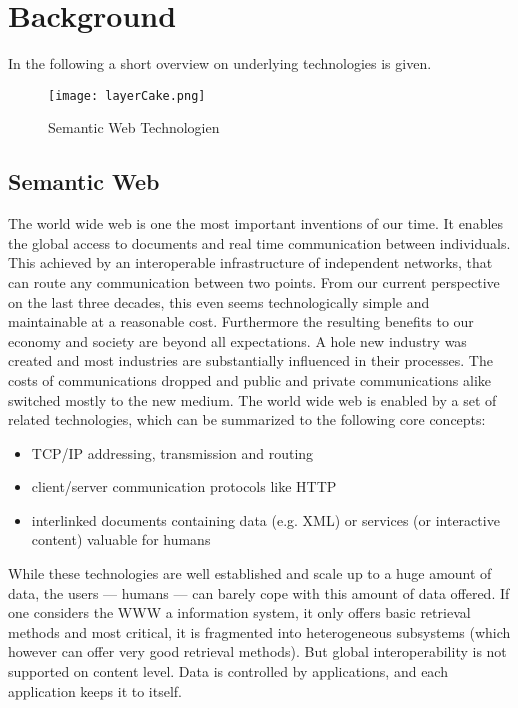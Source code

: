 \section{Background}
\label{sec:basics}

In the following a short overview on underlying technologies is given. 

\begin{figure}
  \centering
    \texttt{[image: layerCake.png]}
  \caption{Semantic Web Technologien}
  \label{fig:layercake}
\end{figure}

\subsection{Semantic Web}

The world wide web is one the most important inventions of our time. 
It enables the global access to documents and real time communication between individuals.
This achieved by an interoperable infrastructure of independent networks, that can route any communication between two points.
From our current perspective on the last three decades, this even seems technologically simple and maintainable at a reasonable cost.
Furthermore the resulting benefits to our economy and society are beyond all expectations. A hole new industry was created and most industries are substantially influenced in their processes.
The costs of communications dropped and public and private communications alike switched mostly to the new medium.
The world wide web is enabled by a set of related technologies, which can be summarized to the following core concepts:
\begin{itemize}
\item TCP/IP addressing, transmission and routing
\item client/server communication protocols like HTTP
\item interlinked documents containing data (e.g. XML) or services (or interactive content) valuable for humans
\end{itemize}
While these technologies are well established and scale up to a huge amount of data, the users --- humans --- can barely cope with this amount of data offered. 
If one considers the WWW a information system, it only offers basic retrieval methods and most critical, it is fragmented into heterogeneous subsystems (which however can offer very good retrieval methods). 
But global interoperability is not supported on content level. Data is controlled by applications, and each application keeps it to itself.
